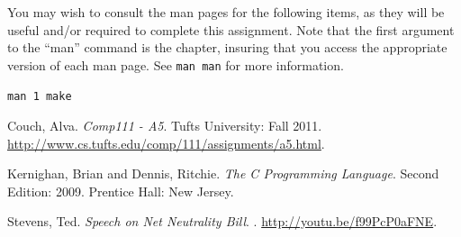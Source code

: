 \documentclass[12pt]{article}
\newenvironment{packed_item}{
\begin{itemize}
  \setlength{\itemsep}{1pt}
  \setlength{\parskip}{0pt}
  \setlength{\parsep}{0pt}
}{\end{itemize}}
\begin{document}
You may wish to consult the man pages for the following items, as they
will be useful and/or required to complete this assignment. Note that
the first argument to the ``man'' command is the chapter, insuring
that you access the appropriate version of each man page. See
\texttt{man man} for more information.

\begin{packed_item}
\item \texttt{man 1 make}
\end{packed_item}

\begin{thebibliography}{9}

 Couch, Alva.
  \newblock \emph{Comp111 - A5}.
  \newblock Tufts University: Fall 2011.
  \newblock \url{http://www.cs.tufts.edu/comp/111/assignments/a5.html}.

 Kernighan, Brian and Dennis, Ritchie.
  \newblock \emph{The C Programming Language}.
  \newblock Second Edition: 2009.
  \newblock Prentice Hall: New Jersey.

 Stevens, Ted.
  \newblock \emph{Speech on Net Neutrality Bill}.
  .
  \newblock \url{http://youtu.be/f99PcP0aFNE}.

\end{thebibliography}
\end{document}
